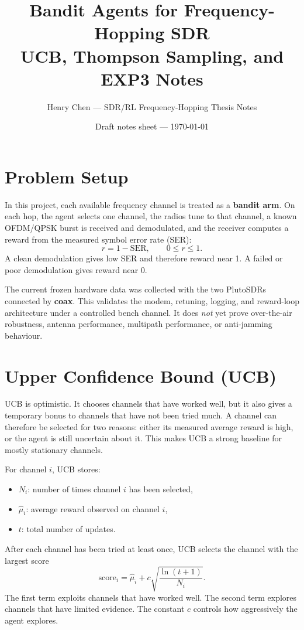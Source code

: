 \documentclass[11pt,a4paper]{article}
\title{Bandit Agents for Frequency-Hopping SDR\\\large UCB, Thompson Sampling, and EXP3 Notes}
\author{Henry Chen --- SDR/RL Frequency-Hopping Thesis Notes}
\date{Draft notes sheet --- \today}
\begin{document}
\maketitle

\section*{Problem Setup}

In this project, each available frequency channel is treated as a \textbf{bandit arm}. On each hop, the agent selects one channel, the radios tune to that channel, a known OFDM/QPSK burst is received and demodulated, and the receiver computes a reward from the measured symbol error rate (SER):
\begin{equation}
    r = 1 - \mathrm{SER}, \qquad 0 \le r \le 1.
\end{equation}
A clean demodulation gives low SER and therefore reward near 1. A failed or poor demodulation gives reward near 0.

\begin{cautionbox}
The current frozen hardware data was collected with the two PlutoSDRs connected by \textbf{coax}. This validates the modem, retuning, logging, and reward-loop architecture under a controlled bench channel. It does \emph{not} yet prove over-the-air robustness, antenna performance, multipath performance, or anti-jamming behaviour.
\end{cautionbox}

\section{Upper Confidence Bound (UCB)}

\begin{intuitionbox}
UCB is optimistic. It chooses channels that have worked well, but it also gives a temporary bonus to channels that have not been tried much. A channel can therefore be selected for two reasons: either its measured average reward is high, or the agent is still uncertain about it. This makes UCB a strong baseline for mostly stationary channels.
\end{intuitionbox}

For channel $i$, UCB stores:
\begin{itemize}
    \item $N_i$: number of times channel $i$ has been selected,
    \item $\hat{\mu}_i$: average reward observed on channel $i$,
    \item $t$: total number of updates.
\end{itemize}
After each channel has been tried at least once, UCB selects the channel with the largest score
\begin{equation}
    \mathrm{score}_i = \hat{\mu}_i + c\sqrt{\frac{\ln(t+1)}{N_i}}.
\end{equation}
The first term exploits channels that have worked well. The second term explores channels that have limited evidence. The constant $c$ controls how aggressively the agent explores.
\end{document}
